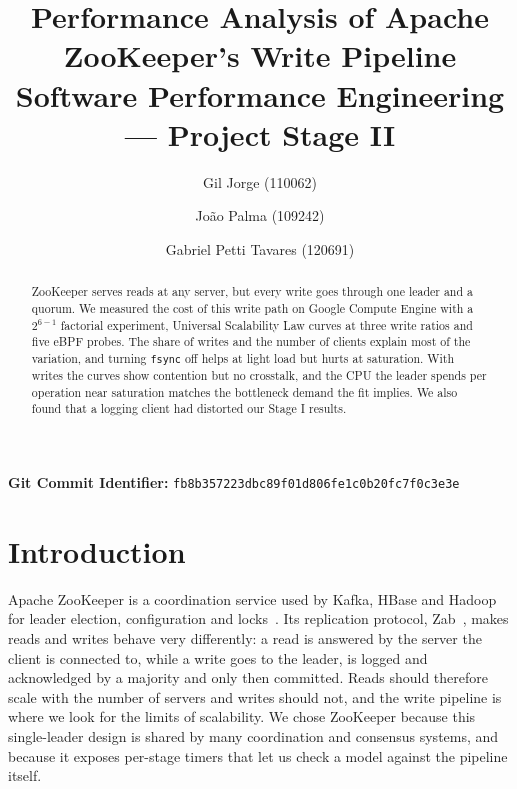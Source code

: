 \documentclass{llncs}
\begin{document}
\title{Performance Analysis of Apache ZooKeeper's Write Pipeline\\
\large Software Performance Engineering --- Project Stage II}

\author{Gil Jorge (110062) \and Jo\~{a}o Palma (109242) \and Gabriel Petti Tavares (120691)}


\maketitle

\begin{abstract}
ZooKeeper serves reads at any server, but every write goes through one leader and a quorum. We measured the cost of this write path on Google Compute Engine with a $2^{6-1}$ factorial experiment, Universal Scalability Law curves at three write ratios and five eBPF probes. The share of writes and the number of clients explain most of the variation, and turning \texttt{fsync} off helps at light load but hurts at saturation. With writes the curves show contention but no crosstalk, and the CPU the leader spends per operation near saturation matches the bottleneck demand the fit implies. We also found that a logging client had distorted our Stage I results.
\end{abstract}

\noindent\textbf{Git Commit Identifier:} \texttt{fb8b357223dbc89f01d806fe1c0b20fc7f0c3e3e}

\section{Introduction}

Apache ZooKeeper is a coordination service used by Kafka, HBase and Hadoop for leader election, configuration and locks~\cite{hunt_zookeeper,apache_zookeeper_overview}. Its replication protocol, Zab~\cite{zab_junqueira}, makes reads and writes behave very differently: a read is answered by the server the client is connected to, while a write goes to the leader, is logged and acknowledged by a majority and only then committed. Reads should therefore scale with the number of servers and writes should not, and the write pipeline is where we look for the limits of scalability. We chose ZooKeeper because this single-leader design is shared by many coordination and consensus systems, and because it exposes per-stage timers that let us check a model against the pipeline itself.
\end{document}
